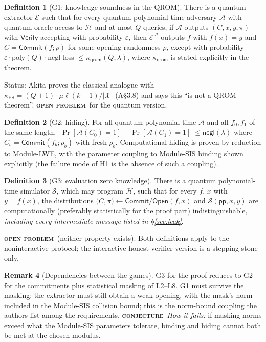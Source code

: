 \documentclass[11pt]{article}
\newcommand{\epitag}[3]{\colorbox{#2}{\textcolor{#1}{\textsc{\footnotesize\bfseries #3}}}}
\newcommand{\conjectureTag}{\epitag{conjyellow}{conjbg}{conjecture}}
\newcommand{\openproblem}{\epitag{openred}{openbg}{open problem}}
\renewcommand{\_}{\textunderscore\allowbreak{}}
\theoremstyle{definition}
\newtheorem{definition}{Definition}
\newtheorem{remark}[definition]{Remark}
\begin{document}
\begin{definition}[G1: knowledge soundness in the QROM]
There is a quantum extractor $\mathcal{E}$ such that for every quantum polynomial-time adversary $\mathcal{A}$ with quantum oracle access to $\mathcal{H}$ and at most $Q$ queries, if $\mathcal{A}$ outputs $(C,x,y,\pi)$ with $\mathsf{Verify}$ accepting with probability $\varepsilon$, then $\mathcal{E}^{\mathcal{A}}$ outputs $f$ with $f(x)=y$ and $C=\mathsf{Commit}(f;\rho)$ for some opening randomness $\rho$, except with probability $\varepsilon\cdot \mathrm{poly}(Q)\cdot\mathrm{negl}$-loss $\le \kappa_{\mathrm{qrom}}(Q,\lambda)$, where $\kappa_{\mathrm{qrom}}$ is stated explicitly in the theorem.
\end{definition}
Status: Akita proves the classical analogue with $\kappa_{\mathrm{FS}}=(Q+1)\cdot\mu\ell(k-1)/|\mathcal{X}|$ (A\S3.8) and says this ``is not a QROM theorem''. \openproblem\ for the quantum version.

\begin{definition}[G2: hiding]
For all quantum polynomial-time $\mathcal{A}$ and all $f_0,f_1$ of the same length, $\big|\Pr[\mathcal{A}(C_0)=1]-\Pr[\mathcal{A}(C_1)=1]\big|\le\mathsf{negl}(\lambda)$ where $C_b=\mathsf{Commit}(f_b;\rho_b)$ with fresh $\rho_b$. Computational hiding is proven by reduction to Module-LWE, with the parameter coupling to Module-SIS binding shown explicitly (the failure mode of H1 is the absence of such a coupling).
\end{definition}

\begin{definition}[G3: evaluation zero knowledge]
There is a quantum polynomial-time simulator $\mathcal{S}$, which may program $\mathcal{H}$, such that for every $f$, $x$ with $y=f(x)$, the distributions
$\big(C,\pi\big)\leftarrow\mathsf{Commit/Open}(f,x)$ and $\mathcal{S}(\mathsf{pp},x,y)$ are computationally (preferably statistically for the proof part) indistinguishable, \emph{including every intermediate message listed in \S\ref{sec:leak}}.
\end{definition}
\openproblem\ (neither property exists). Both definitions apply to the noninteractive protocol; the interactive honest-verifier version is a stepping stone only.

\begin{remark}[Dependencies between the games]
G3 for the proof reduces to G2 for the commitments plus statistical masking of L2--L8. G1 must survive the masking: the extractor must still obtain a weak opening, with the mask's norm included in the Module-SIS collision bound; this is the norm-bound coupling the authors list among the requirements. \conjectureTag\ \textit{How it fails:} if masking norms exceed what the Module-SIS parameters tolerate, binding and hiding cannot both be met at the chosen modulus.
\end{remark}
\end{document}
